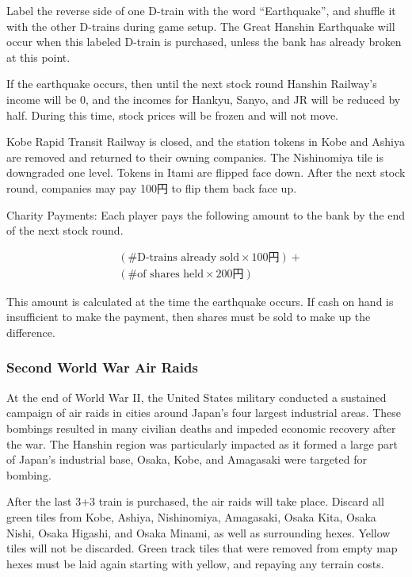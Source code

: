 \documentclass{article}
\begin{document}
\begin{CJK}{UTF8}{min}
\begin{multicols}{2}
Label the reverse side of one D-train with the word ``Earthquake'',
and shuffle it with the other D-trains during game setup. The Great
Hanshin Earthquake will occur when this labeled D-train is purchased,
unless the bank has already broken at this point.

If the earthquake occurs, then until the next stock round Hanshin
Railway's income will be 0, and the incomes for Hankyu, Sanyo, and JR
will be reduced by half. During this time, stock prices will be frozen
and will not move.

Kobe Rapid Transit Railway is closed, and the station tokens in Kobe
and Ashiya are removed and returned to their owning companies. The
Nishinomiya tile is downgraded one level. Tokens in Itami are flipped
face down. After the next stock round, companies may pay 100円 to flip
them back face up.

Charity Payments: Each player pays the following amount to the bank by
the end of the next stock round.

\begin{align*}
&(\textrm{\# D-trains already sold} \times \textrm{100円}) + \\
&(\textrm{\# of shares held} \times \textrm{200円})
\end{align*}

This amount is calculated at the time the earthquake occurs. If cash
on hand is insufficient to make the payment, then shares must be sold to
make up the difference.


\subsubsection{Second World War Air Raids}

At the end of World War II, the United States military conducted a
sustained campaign of air raids in cities around Japan's four
largest industrial areas. These bombings resulted in many civilian
deaths and impeded economic recovery after the war. The Hanshin region
was particularly impacted as it formed a large part of Japan's
industrial base, Osaka, Kobe, and Amagasaki were targeted for bombing.

After the last 3+3 train is purchased, the air raids will take
place. Discard all green tiles from Kobe, Ashiya, Nishinomiya,
Amagasaki, Osaka Kita, Osaka Nishi, Osaka Higashi, and Osaka Minami,
as well as surrounding hexes. Yellow tiles will not be
discarded. Green track tiles that were removed from empty map hexes
must be laid again starting with yellow, and repaying any terrain costs.


\end{multicols}
\end{CJK}
\end{document}
